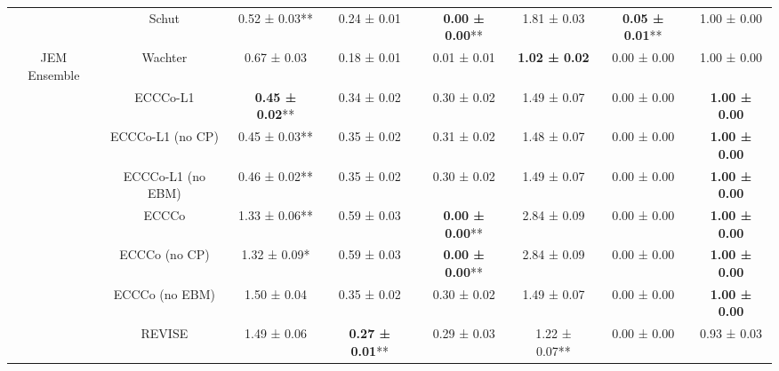 \begin{table}
{\begin{tabular}[t]{cccccccc}
 & Schut & 0.52 ± 0.03** & 0.24 ± 0.01\hphantom{*}\hphantom{*} & \textbf{0.00 ± 0.00}** & 1.81 ± 0.03\hphantom{*}\hphantom{*} & \textbf{0.05 ± 0.01}** & 1.00 ± 0.00\hphantom{*}\hphantom{*}\\

\multirow[t]{-9}{*}{\centering\arraybackslash JEM Ensemble} & Wachter & 0.67 ± 0.03\hphantom{*}\hphantom{*} & 0.18 ± 0.01\hphantom{*}\hphantom{*} & 0.01 ± 0.01\hphantom{*}\hphantom{*} & \textbf{1.02 ± 0.02}\hphantom{*}\hphantom{*} & 0.00 ± 0.00\hphantom{*}\hphantom{*} & 1.00 ± 0.00\hphantom{*}\hphantom{*}\\
\cmidrule{1-8}
 & ECCCo-L1 & \textbf{0.45 ± 0.02}** & 0.34 ± 0.02\hphantom{*}\hphantom{*} & 0.30 ± 0.02\hphantom{*}\hphantom{*} & 1.49 ± 0.07\hphantom{*}\hphantom{*} & 0.00 ± 0.00\hphantom{*}\hphantom{*} & \textbf{1.00 ± 0.00}\hphantom{*}\hphantom{*}\\

 & ECCCo-L1 (no CP) & 0.45 ± 0.03** & 0.35 ± 0.02\hphantom{*}\hphantom{*} & 0.31 ± 0.02\hphantom{*}\hphantom{*} & 1.48 ± 0.07\hphantom{*}\hphantom{*} & 0.00 ± 0.00\hphantom{*}\hphantom{*} & \textbf{1.00 ± 0.00}\hphantom{*}\hphantom{*}\\

 & ECCCo-L1 (no EBM) & 0.46 ± 0.02** & 0.35 ± 0.02\hphantom{*}\hphantom{*} & 0.30 ± 0.02\hphantom{*}\hphantom{*} & 1.49 ± 0.07\hphantom{*}\hphantom{*} & 0.00 ± 0.00\hphantom{*}\hphantom{*} & \textbf{1.00 ± 0.00}\hphantom{*}\hphantom{*}\\

 & ECCCo & 1.33 ± 0.06** & 0.59 ± 0.03\hphantom{*}\hphantom{*} & \textbf{0.00 ± 0.00}** & 2.84 ± 0.09\hphantom{*}\hphantom{*} & 0.00 ± 0.00\hphantom{*}\hphantom{*} & \textbf{1.00 ± 0.00}\hphantom{*}\hphantom{*}\\

 & ECCCo (no CP) & 1.32 ± 0.09*\hphantom{*} & 0.59 ± 0.03\hphantom{*}\hphantom{*} & \textbf{0.00 ± 0.00}** & 2.84 ± 0.09\hphantom{*}\hphantom{*} & 0.00 ± 0.00\hphantom{*}\hphantom{*} & \textbf{1.00 ± 0.00}\hphantom{*}\hphantom{*}\\

 & ECCCo (no EBM) & 1.50 ± 0.04\hphantom{*}\hphantom{*} & 0.35 ± 0.02\hphantom{*}\hphantom{*} & 0.30 ± 0.02\hphantom{*}\hphantom{*} & 1.49 ± 0.07\hphantom{*}\hphantom{*} & 0.00 ± 0.00\hphantom{*}\hphantom{*} & \textbf{1.00 ± 0.00}\hphantom{*}\hphantom{*}\\

 & REVISE & 1.49 ± 0.06\hphantom{*}\hphantom{*} & \textbf{0.27 ± 0.01}** & 0.29 ± 0.03\hphantom{*}\hphantom{*} & 1.22 ± 0.07** & 0.00 ± 0.00\hphantom{*}\hphantom{*} & 0.93 ± 0.03\hphantom{*}\hphantom{*}\\


\end{tabular}}
\end{table}
